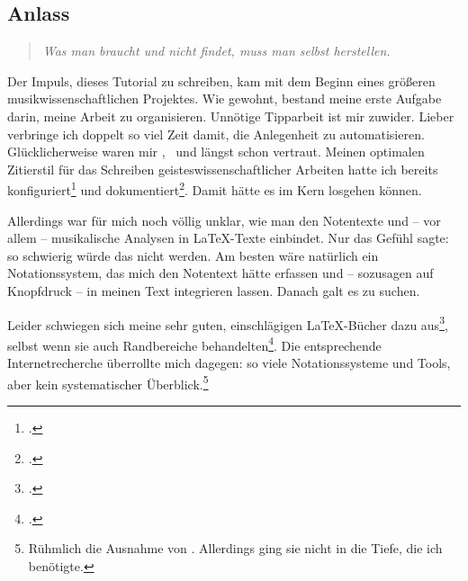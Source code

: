 %
%
%



\subsection{Anlass}

\begin{quote}\textit{Was man braucht und nicht findet, muss man selbst herstellen.}
\end{quote}

Der Impuls, dieses Tutorial zu schreiben, kam mit dem Beginn eines größeren
musikwissenschaftlichen Projektes. Wie gewohnt, bestand meine erste Aufgabe
darin, meine Arbeit zu organisieren. Unnötige Tipparbeit ist mir zuwider. Lieber
verbringe ich doppelt so viel Zeit damit, die Anlegenheit zu automatisieren.
Glücklicherweise waren mir \acc{\LaTeX}, \ und  längst
schon vertraut. Meinen optimalen Zitierstil für das Schreiben
geisteswissenschaftlicher Arbeiten hatte ich bereits
konfiguriert\footcite[vgl.][\nopage wp]{Reincke2018a} und
dokumentiert\footcite[vgl][2ff]{Reincke2018b}. Damit hätte es im Kern losgehen
können.

Allerdings war für mich noch völlig unklar, wie man den Notentexte und -- vor
allem -- musikalische Analysen in \LaTeX-Texte einbindet. Nur das Gefühl sagte:
so schwierig würde das nicht werden. Am besten wäre natürlich ein
No\-ta\-tions\-system, das mich den Notentext hätte erfassen und -- sozusagen auf
Knopfdruck -- in meinen Text integrieren lassen. Danach galt es zu suchen.

Leider schwiegen sich meine sehr guten, einschlägigen \LaTeX-Bücher dazu
aus\footcite[vgl.][vi ff, insbesondere 905 u. 909: das umfangreiche Register
erwähnt weder Musik im allgemeinen noch LilyPond oder MusiX\TeX\ im
Besonderen]{Voss2012a}, selbst wenn sie auch Randbereiche
behandelten\footcite[vgl.][vii ff, insbesondere 1080 u.
1087: auch dieses umfangreiche Register erwähnt weder Musik im allgemeinen noch
LilyPond oder MusiX\TeX\ im Besonderen.]{MitGoo2005a}. Die entsprechende
Internetrecherche überrollte mich dagegen: so viele Notationssysteme und Tools,
aber kein systematischer Überblick.\footnote{Rühmlich die Ausnahme von
\cite[][\nopage wp]{Thoma2018a}. Allerdings ging sie nicht in die Tiefe, die ich
benötigte.}

